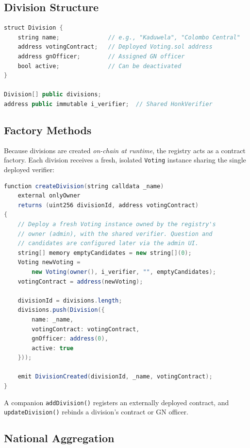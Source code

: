 \subsection{Division Structure}

\begin{lstlisting}[language=Java, caption={Division struct and state in ElectionRegistry.}]
struct Division {
    string name;              // e.g., "Kaduwela", "Colombo Central"
    address votingContract;   // Deployed Voting.sol address
    address gnOfficer;        // Assigned GN officer
    bool active;              // Can be deactivated
}

Division[] public divisions;
address public immutable i_verifier;  // Shared HonkVerifier
\end{lstlisting}

\subsection{Factory Methods}

Because divisions are created \emph{on-chain at runtime}, the registry acts as a contract factory. Each division receives a fresh, isolated \texttt{Voting} instance sharing the single deployed verifier:

\begin{lstlisting}[language=Java, caption={Division creation via the factory pattern.}]
function createDivision(string calldata _name)
    external onlyOwner
    returns (uint256 divisionId, address votingContract)
{
    // Deploy a fresh Voting instance owned by the registry's
    // owner (admin), with the shared verifier. Question and
    // candidates are configured later via the admin UI.
    string[] memory emptyCandidates = new string[](0);
    Voting newVoting =
        new Voting(owner(), i_verifier, "", emptyCandidates);
    votingContract = address(newVoting);

    divisionId = divisions.length;
    divisions.push(Division({
        name: _name,
        votingContract: votingContract,
        gnOfficer: address(0),
        active: true
    }));

    emit DivisionCreated(divisionId, _name, votingContract);
}
\end{lstlisting}

A companion \texttt{addDivision()} registers an externally deployed contract, and \texttt{updateDivision()} rebinds a division's contract or GN officer.

\subsection{National Aggregation}

